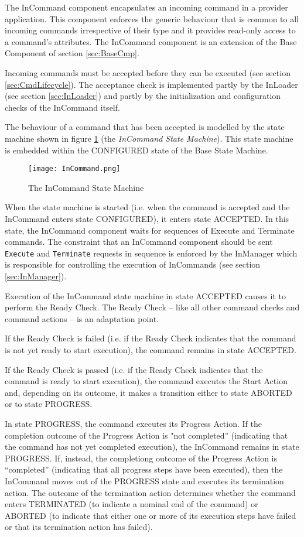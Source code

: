 The InCommand component encapsulates an incoming command in a provider application. This component enforces the generic behaviour that is common to all incoming commands irrespective of their type and it provides read-only access to a command's attributes. The InCommand component is an extension of the Base Component of section \ref{sec:BaseCmp}. 

Incoming commands must be accepted before they can be executed (see section \ref{sec:CmdLifecycle}). The acceptance check is implemented partly by the InLoader (see section \ref{sec:InLoader}) and partly by the initialization and configuration checks of the InCommand itself.

The behaviour of a command that has been accepted is modelled by the state machine shown in figure \ref{fig:InCommand} (the \textit{InCommand State Machine}). This state machine is embedded within the CONFIGURED state of the Base State Machine. 

\begin{figure}[h]
 \centering
 \texttt{[image: InCommand.png]}
 \caption{The InCommand State Machine}
 \label{fig:InCommand}
\end{figure}

When the state machine is started (i.e. when the command is accepted and the InCommand enters state CONFIGURED), it enters state ACCEPTED. In this state, the InCommand component waits for sequences of Execute and Terminate commands. The constraint that an InCommand component should be sent \texttt{Execute} and \texttt{Terminate} requests in sequence is enforced by the InManager which is responsible for controlling the execution of InCommands (see section \ref{sec:InManager}).

Execution of the InCommand state machine in state ACCEPTED causes it to perform the Ready Check. The Ready Check – like all other command checks and command actions – is an adaptation point.  

If the Ready Check is failed (i.e. if the Ready Check indicates that the command is not yet ready to start execution), the command remains in state ACCEPTED.

If the Ready Check is passed (i.e. if the Ready Check indicates that the command is ready to start execution), the command executes the Start Action and, depending on its outcome, it makes a transition either to state ABORTED or to state PROGRESS.  

In state PROGRESS, the command executes its Progress Action. If the completion outcome of the Progress Action is "not completed” (indicating that the command has not yet completed execution), the InCommand remains in state PROGRESS. If, instead, the completiong outcome of the Progress Action is “completed” (indicating that all progress steps have been executed), then the InCommand moves out of the PROGRESS state and executes its termination action. The outcome of the termination action determines whether the command enters TERMINATED (to indicate a nominal end of the command) or ABORTED (to indicate that either one or more of its execution steps have failed or that its termination action has failed).  

